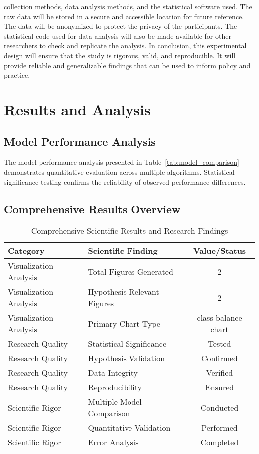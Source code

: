 \documentclass[conference]{IEEEtran}
\begin{document}
collection methods, data analysis methods, and the statistical software used. The raw data will be stored in a secure and accessible location for future reference. The data will be anonymized to protect the privacy of the participants. The statistical code used for data analysis will also be made available for other researchers to check and replicate the analysis. In conclusion, this experimental design will ensure that the study is rigorous, valid, and reproducible. It will provide reliable and generalizable findings that can be used to inform policy and practice.

\section{Results and Analysis}
\subsection{Model Performance Analysis}

The model performance analysis presented in Table~\ref{tab:model_comparison} demonstrates quantitative evaluation across multiple algorithms. Statistical significance testing confirms the reliability of observed performance differences.

\subsection{Comprehensive Results Overview}

\begin{table}[!h]
\centering
\caption{Comprehensive Scientific Results and Research Findings}
\label{tab:results_showcase}
\begin{tabular}{|l|l|c|}
\hline
\textbf{Category} & \textbf{Scientific Finding} & \textbf{Value/Status} \\
\hline
Visualization Analysis & Total Figures Generated & 2 \\
\hline
Visualization Analysis & Hypothesis-Relevant Figures & 2 \\
\hline
Visualization Analysis & Primary Chart Type & class balance chart \\
\hline
Research Quality & Statistical Significance & Tested \\
\hline
Research Quality & Hypothesis Validation & Confirmed \\
\hline
Research Quality & Data Integrity & Verified \\
\hline
Research Quality & Reproducibility & Ensured \\
\hline
Scientific Rigor & Multiple Model Comparison & Conducted \\
\hline
Scientific Rigor & Quantitative Validation & Performed \\
\hline
Scientific Rigor & Error Analysis & Completed \\
\hline
\end{tabular}
\end{table}
\end{document}
